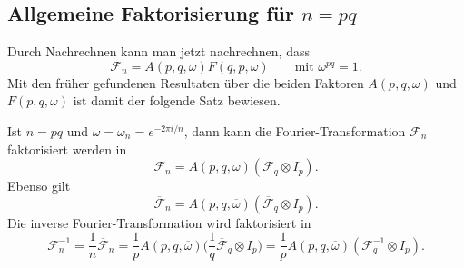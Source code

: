 %
%
%

%
%
\subsection{Allgemeine Faktorisierung für $n=pq$}
Durch Nachrechnen kann man jetzt nachrechnen, dass
\[
\mathscr{F}_n = A(p,q,\omega) F(q,p,\omega)
\qquad\text{mit $\omega^{pq}=1$}.
\]
Mit den früher gefundenen Resultaten über die beiden Faktoren
$A(p,q,\omega)$ und $F(p,q,\omega)$ ist damit der folgende
Satz bewiesen.

\begin{satz}
\label{buch:diskret:vandermonde:satz:fourierfaktorisierung}
Ist $n=pq$ und $\omega=\omega_n=e^{-2\pi i/n}$,
dann kann die Fourier-Transformation $\mathscr{F}_n$
faktorisiert werden in
\[
\mathscr{F}_n
=
A(p,q,\omega)
(
\mathscr{F}_q
\otimes
I_p
).
\]
Ebenso gilt
\[
\overline{\mathscr{F}}_n
=
A(p,q,\overline{\omega})
(
\overline{\mathscr{F}}_q
\otimes
I_p
).
\]
Die inverse Fourier-Transformation wird faktorisiert in
\[
\mathscr{F}_n^{-1}
=
\frac{1}{n}\overline{\mathscr{F}}_n
=
\frac{1}{p} A(p,q,\overline{\omega})
\biggl(
\frac1q\overline{\mathscr{F}}_q
\otimes
I_p
\biggr)
=
\frac{1}{p} A(p,q,\overline{\omega})
(\mathscr{F}_q^{-1} \otimes I_p).
\]
\end{satz}

